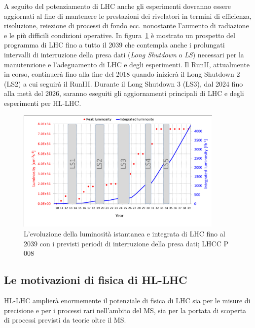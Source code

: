 A seguito del potenziamento di LHC anche gli esperimenti dovranno essere aggiornati al fine di mantenere le prestazioni dei rivelatori in termini di efficienza, risoluzione, reiezione di processi di fondo ecc. nonostante l'aumento di radiazione e le più difficili condizioni operative.
In figura~\ref{HL-LHC} è mostrato un prospetto del programma di LHC fino a tutto il 2039 che contempla anche i prolungati intervalli di interruzione della presa dati ({\em Long Shutdown} o {\em LS}) necessari per la manutenzione e l'adeguamento di LHC e degli esperimenti. Il RunII, attualmente in corso, continuerà fino alla fine del 2018 quando inizierà il Long Shutdown 2 (LS2) a cui seguir\`a il RunIII. Durante il Long Shutdown 3 (LS3), dal 2024 fino alla metà del 2026, saranno eseguiti gli aggiornamenti principali di LHC e degli esperimenti per HL-LHC.
\begin{figure}
\centering
\includegraphics[width =0.9\textwidth]{Immagini/LHC_lumi_2010_2039.png}
\caption{L'evoluzione della luminosit\`a istantanea e integrata di LHC fino al 2039 con i previsti periodi di interruzione della presa dati; LHCC P 008}
\label{HL-LHC}
\end{figure}

\subsection{Le motivazioni di fisica di HL-LHC}

HL-LHC amplier\`a enormemente il potenziale di fisica di LHC sia per le misure di precisione e per i processi rari nell'ambito del MS, sia per la portata di scoperta di processi previsti da teorie oltre il MS.
 

